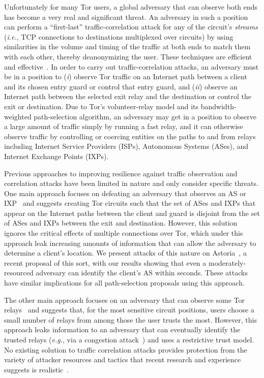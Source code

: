\documentclass[conference]{styles/IEEEtran}
\newcommand{\eg}{\emph{e.g.}}
\newcommand{\ie}{\emph{i.e.}}
\begin{document}
Unfortunately for many Tor users, a global adversary that can observe both ends
has become a very real and significant
threat. An adversary in such a position can perform a ``first-last''
traffic-correlation attack for any of the circuit's \emph{streams} (\ie{}, TCP connections
to destinations multiplexed over circuits)
by using similarities in the volume and timing of the traffic at both ends to match them with
each other, thereby deanonymizing the user. These techniques are efficient and
effective~\cite{torta05}. In order to carry out traffic-correlation attacks, an
adversary must be in a position to (\emph{i}) observe Tor traffic on an Internet
path between a client and its chosen entry guard or control
that entry guard, and (\emph{ii}) observe an Internet path between the
selected exit relay
and the destination or control the exit or destination. Due to Tor's
volunteer-relay model and its bandwidth-weighted path-selection algorithm, an
adversary may get in a position to observe a large amount of traffic simply
by running a fast relay, and it can otherwise observe traffic by controlling or
coercing entities on the paths to and from relays including Internet Service
Providers (ISPs), Autonomous Systems (ASes), and Internet Exchange Points
(IXPs).

Previous approaches to improving resilience against traffic observation and
correlation attacks have been limited in nature and only consider specific
threats. One main approach focuses on defeating an adversary that observes an
AS or
IXP~\cite{feamster:wpes2004,tor-as,lastor,murdoch:pet2007,juen-masters,astoria-ndss2016,denasa-pets2016}
and suggests creating Tor circuits such
that the set of ASes and IXPs that appear on the Internet paths between the client and
guard is disjoint from the set of ASes and IXPs between the exit and destination.
However, this solution ignores the critical effects of multiple connections over Tor,
which under this approach leak increasing amounts of information that can allow the
adversary to determine a client's location.
We present attacks of this nature on Astoria~\cite{astoria-ndss2016}, a recent
proposal of this sort, with our results showing that even a moderately-resourced adversary
can identify the client's AS within seconds. These attacks have similar implications for
all path-selection proposals using this approach.

The other main approach focuses on an adversary that
can observe some Tor relays~\cite{trusted-set,jsdm11ccs} and suggests that,
for the most sensitive circuit positions, users
choose a small number of relays from among those the user trusts the most. However, this
approach leaks information to an adversary that can
eventually identify the trusted relays (\eg{}, via a congestion
attack~\cite{long-paths,howlow}) and uses a restrictive trust model.
No existing solution to traffic correlation attacks provides protection from the
variety of attacker resources and tactics that recent research and experience
suggests is realistic~\cite{ccs2013-usersrouted}.
\end{document}
